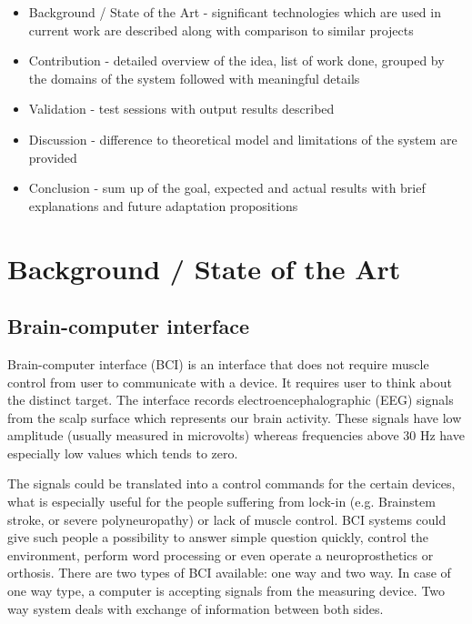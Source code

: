 \documentclass[12pt]{article}
\begin{document}
\begin{itemize}
\item Background / State of the Art - significant technologies which are used in current work are described along with comparison to similar projects
\item Contribution - detailed overview of the idea, list of work done, grouped by the domains of the system followed with meaningful details
\item Validation - test sessions with output results described
\item Discussion - difference to theoretical model and limitations of the system are provided
\item Conclusion - sum up of the goal, expected and actual results with brief explanations and future adaptation propositions
\end{itemize}

\newpage
\section{Background / State of the Art} 

\subsection{Brain-computer interface}

Brain-computer interface (BCI) is an interface that does not require muscle control from user to communicate with a device. It requires user to think about the distinct target. The interface records electroencephalographic (EEG) signals from the scalp surface which represents our brain activity. These signals have low amplitude (usually measured in microvolts) whereas frequencies above 30 Hz have especially low values which tends to zero.\cite{bci_vidal}

The signals could be translated into a control commands for the certain devices, what is especially useful for the people suffering from lock-in (e.g. Brainstem stroke, or severe polyneuropathy) or lack of muscle control.  BCI systems could give such people a possibility to answer simple question quickly, control the environment, perform word processing or even operate a neuroprosthetics or orthosis.
There are two types of BCI available: one way and two way. In case of one way type, a computer is accepting signals from the measuring device. Two way system deals with exchange of information between both sides.\cite{bci_shivangi}
\end{document}

